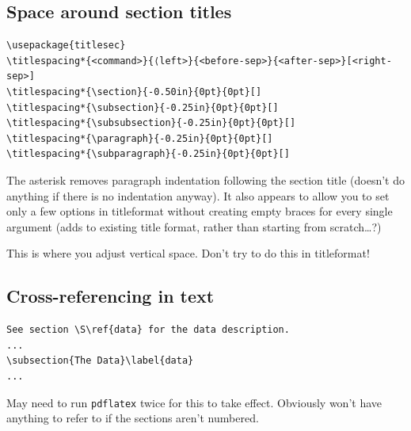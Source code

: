 \documentclass{article}
\begin{document}
\subsection{Space around section titles}
\begin{minipage}[t]{\textwidth}
\begin{lstlisting}
\usepackage{titlesec}
\titlespacing*{<command>}{⟨left>}{<before-sep>}{<after-sep>}[<right-sep>]
\titlespacing*{\section}{-0.50in}{0pt}{0pt}[]
\titlespacing*{\subsection}{-0.25in}{0pt}{0pt}[]
\titlespacing*{\subsubsection}{-0.25in}{0pt}{0pt}[]
\titlespacing*{\paragraph}{-0.25in}{0pt}{0pt}[]
\titlespacing*{\subparagraph}{-0.25in}{0pt}{0pt}[]
\end{lstlisting}
\end{minipage}
\begin{minipage}[t]{\textwidth}
    The asterisk removes paragraph indentation following the section title
    (doesn't do anything if there is no indentation anyway). It also appears to
    allow you to set only a few options in titleformat without creating empty
    braces for every single argument (adds to existing title format, rather
    than starting from scratch\ldots?)

    This is where you adjust vertical space. Don't try to do this in titleformat!
\end{minipage}

\subsection{Cross-referencing in text}
\begin{lstlisting}
See section \S\ref{data} for the data description.
...
\subsection{The Data}\label{data}
...
\end{lstlisting}
May need to run \texttt{pdflatex} twice for this to take effect.
Obviously won't have anything to refer to if the sections aren't numbered.
\end{document}
